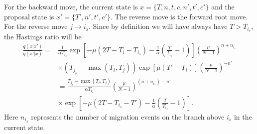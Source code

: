 \documentclass[a4paper,11pt]{article}
\begin{document}
For the backward move, the current state is $x=\{T,n,t,c,n',t',c'\}$
and the proposal state is $x'=\{T',n',t',c'\}$. The reverse move is
the forward root move. For the reverse move $j\rightarrow i_s$. Since
by definition we will have always have $T>T_{i_s}$, the Hastings ratio
will be
\begin{align}
  \frac{q(x|x')}{q(x'|x)}
=&
\frac{1}{\alpha T_{i_s}}\exp\left[-\mu(2T-T_i-T_{i_s})-\frac{1}{\alpha}\left(\frac{T}{T_{i_s}}-1\right)\right]\left(\frac{\mu}{N-1}\right)^{n+n_{i_s}}\nonumber\\
&\times
(T_{j_p}-\max(T_i,T_j))\exp\left[\mu(T'-T_i)\right]\left(\frac{\mu}{N-1}\right)^{-n'}\nonumber\\
&=\frac{T_{j_p}-\max(T_i,T_j)}{\alpha T_{i_s}}\left(\frac{\mu}{N-1}\right)^{(n+n_{i_s})-n'}\nonumber\\
&\times\exp\left[-\mu(2T-T_{i_s}-T')-\frac{1}{\alpha}\left(\frac{T}{T_{i_s}}-1\right)\right].
\end{align}
Here $n_{i_s}$ represents the number of migration events on the branch
above $i_s$ in the current state.
\end{document}
